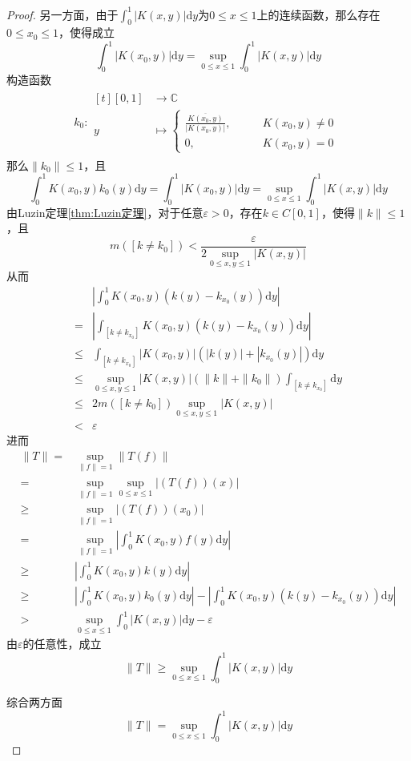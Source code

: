 \documentclass[lang = cn, scheme = chinese, thmcnt = section]{elegantbook}
\newcommand{\C}{\mathbb{C}}  		   %
\begin{document}
\begin{proof}
	另一方面，由于$\displaystyle\int_0^1|K(x,y)|\mathrm{d}y$为$0\le x\le 1$上的连续函数，那么存在$0\le x_0\le 1$，使得成立
	$$
	\int_0^1|K(x_0,y)|\mathrm{d}y=\sup_{0\le x\le 1}\int_0^1|K(x,y)|\mathrm{d}y
	$$
	构造函数
	\begin{align*}
		k_{0}:\begin{aligned}[t]
			[0,1]&\longrightarrow \C\\
			y&\longmapsto \begin{cases}
				\displaystyle\frac{\overline{K(x_0,y)}}{|K(x_0,y)|},\qquad & K(x_0,y)\ne0\\
				0,\qquad & K(x_0,y)=0
			\end{cases}
		\end{aligned}
	\end{align*}
	那么$\|k_0\|\le 1$，且
	$$
	\int_0^1K(x_0,y)k_{0}(y)\mathrm{d}y=\int_0^1|K(x_0,y)|\mathrm{d}y=\sup_{0\le x\le 1}\int_0^1|K(x,y)|\mathrm{d}y
	$$
	由Luzin定理\ref{thm:Luzin定理}，对于任意$\varepsilon>0$，存在$k\in C[0,1]$，使得$\|k\|\le 1$，且
	$$
	m([k\ne k_{0}])<\frac{\varepsilon}{2\sup\limits_{0\le x,y\le 1}|K(x,y)|}
	$$
	从而
	\begin{align*}
		&\left| \int_0^1K(x_0,y)(k(y)-k_{x_0}(y))\mathrm{d}y \right|\\
		=&\left| \int_{[k\ne k_{x_0}]}K(x_0,y)(k(y)-k_{x_0}(y))\mathrm{d}y \right|\\
		\le&\int_{[k\ne k_{x_0}]}|K(x_0,y)|(|k(y)|+|k_{x_0}(y)|)\mathrm{d}y\\
		\le & \sup\limits_{0\le x,y\le 1}|K(x,y)|(\|k\|+\|k_{0}\|)\int_{[k\ne k_{x_0}]}\mathrm{d}y\\
		\le & 2m([k\ne k_{0}])\sup\limits_{0\le x,y\le 1}|K(x,y)|\\
		< & \varepsilon
	\end{align*}
	进而
	\begin{align*}
		\|T\|=&\sup_{\|f\|=1}\|T(f)\|\\
		=&\sup_{\|f\|=1}\sup_{0\le x\le 1}|(T(f))(x)|\\
		\ge &\sup_{\|f\|=1}|(T(f))(x_0)|\\
		= & \sup_{\|f\|=1} \left| \int_0^1K(x_0,y)f(y)\mathrm{d}y \right|\\
		\ge & \left| \int_0^1K(x_0,y)k(y)\mathrm{d}y \right|\\
		\ge & \left| \int_0^1K(x_0,y)k_{0}(y)\mathrm{d}y \right|-\left| \int_0^1K(x_0,y)(k(y)-k_{x_0}(y))\mathrm{d}y \right|\\
		> & \sup_{0\le x\le 1}\int_0^1|K(x,y)|\mathrm{d}y-\varepsilon
	\end{align*}
	由$\varepsilon$​的任意性，成立
	$$
	\|T\|\ge \sup_{0\le x\le 1}\int_0^1|K(x,y)|\mathrm{d}y
	$$
	
	综合两方面
	$$
	\|T\|=\sup_{0\le x\le 1}\int_0^1|K(x,y)|\mathrm{d}y
	$$
\end{proof}
\end{document}
